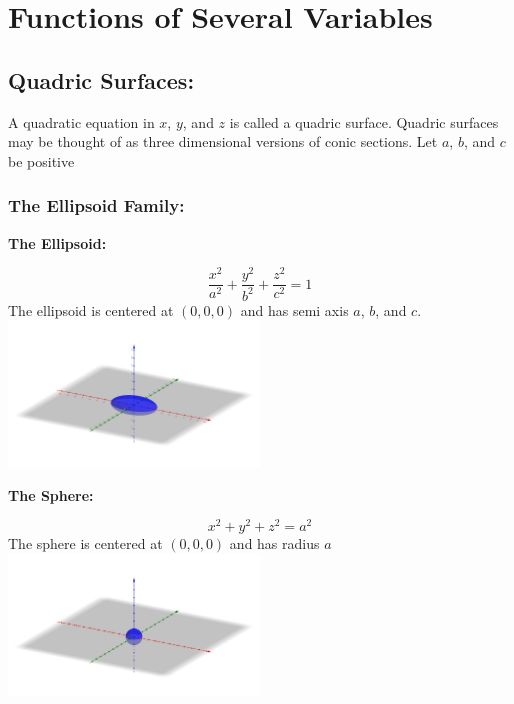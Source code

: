 \documentclass[14pt]{article}
\begin{document}
    \section{Functions of Several Variables}
    \subsection{Quadric Surfaces:}
    A quadratic equation in $x$, $y$, and $z$ is called a quadric surface. Quadric surfaces may be thought of as three dimensional versions of conic sections.
    Let $a$, $b$, and $c$ be positive
    \subsubsection{The Ellipsoid Family:}
    \textbf{The Ellipsoid:}
    \begin{multicols}{2}
        \begin{equation}
            \frac{x^2}{a^2}+\frac{y^2}{b^2}+\frac{z^2}{c^2}=1
        \end{equation}
        The ellipsoid is centered at $(0, 0, 0)$ and has semi axis $a$, $b$, and $c$.\\
        \includegraphics[width=0.5\textwidth]{Ellipsoid.png}
    \end{multicols}
    \textbf{The Sphere:}
    \begin{multicols}{2}
        \begin{equation}
            x^2+y^2+z^2=a^2
        \end{equation}
        The sphere is centered at $(0,0,0)$ and has radius $a$\\
        \includegraphics[width=0.5\textwidth]{Sphere.png}    
    \end{multicols}
    \pagebreak
\end{document}
